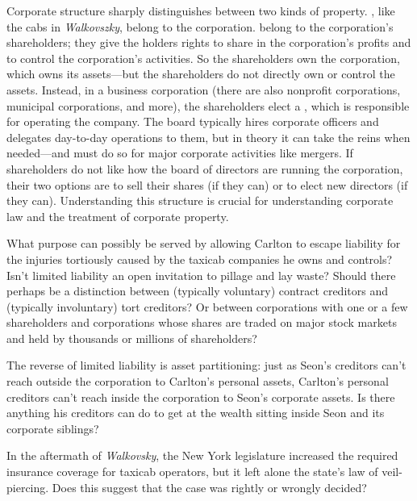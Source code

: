 \item Corporate structure sharply distinguishes between two kinds of property.
, like the cabs in \textit{Walkovszky},
belong to the corporation.  belong to
the corporation's shareholders;
they give the holders rights to share in the corporation's profits and to
control the corporation's activities. So the shareholders own the corporation,
which owns its assets---but the shareholders do not directly own or control the
assets. Instead, in a business corporation (there are also nonprofit
corporations, municipal corporations, and more), the shareholders elect a
, which is responsible for operating the company. The
board typically hires corporate officers and delegates day-to-day operations to
them, but in theory it can take the reins when needed---and must do so for major
corporate activities like mergers. If shareholders do not like how the board of
directors are running the corporation, their two options are to sell their
shares (if they can) or to elect new directors (if they can). Understanding this
structure is crucial for understanding corporate law and the treatment of
corporate property.

\item What purpose can possibly be served by allowing Carlton to escape
liability for the injuries tortiously caused by the taxicab companies he owns
and controls? Isn't limited liability an open invitation to pillage and lay
waste? Should there perhaps be a distinction between (typically voluntary)
contract creditors and (typically involuntary) tort creditors? Or between
 corporations with one or a few shareholders and
 corporations whose shares are traded on major
stock markets and held by thousands or millions of shareholders?

\item The reverse of limited liability is asset partitioning: just as Seon's
creditors can't reach outside the corporation to Carlton's personal assets,
Carlton's personal creditors can't reach inside the corporation to Seon's
corporate assets. Is there anything his creditors can do to get at the wealth
sitting inside Seon and its corporate siblings?

\item In the aftermath of \textit{Walkovsky}, the New York legislature increased
the required insurance coverage for taxicab operators, but it left alone the
state's law of veil-piercing. Does this suggest that the case was rightly or
wrongly decided?

